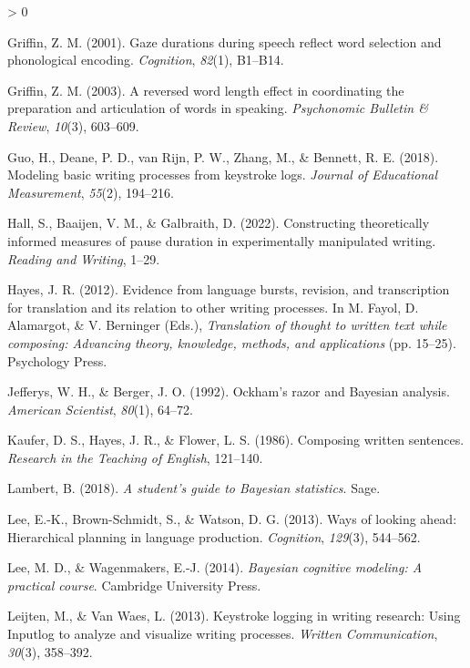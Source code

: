 \documentclass[
  english,
  man,floatsintext]{apa7}
\newlength{\cslhangindent}
\newenvironment{CSLReferences}[2] %
 {%
  \setlength{\parindent}{0pt}
  \ifodd #1 \everypar{\setlength{\hangindent}{\cslhangindent}}\ignorespaces\fi
  \ifnum #2 > 0
  \setlength{\parskip}{#2\baselineskip}
  \fi
 }%
 {}
\begin{document}
\begin{CSLReferences}{1}{0}
\leavevmode\hypertarget{ref-gri01}{}%
Griffin, Z. M. (2001). Gaze durations during speech reflect word selection and phonological encoding. \emph{Cognition}, \emph{82}(1), B1--B14.

\leavevmode\hypertarget{ref-griffin2003reversed}{}%
Griffin, Z. M. (2003). A reversed word length effect in coordinating the preparation and articulation of words in speaking. \emph{Psychonomic Bulletin \& Review}, \emph{10}(3), 603--609.

\leavevmode\hypertarget{ref-guo2018modeling}{}%
Guo, H., Deane, P. D., van Rijn, P. W., Zhang, M., \& Bennett, R. E. (2018). Modeling basic writing processes from keystroke logs. \emph{Journal of Educational Measurement}, \emph{55}(2), 194--216.

\leavevmode\hypertarget{ref-hall2022constructing}{}%
Hall, S., Baaijen, V. M., \& Galbraith, D. (2022). Constructing theoretically informed measures of pause duration in experimentally manipulated writing. \emph{Reading and Writing}, 1--29.

\leavevmode\hypertarget{ref-hayes2012evidence}{}%
Hayes, J. R. (2012). Evidence from language bursts, revision, and transcription for translation and its relation to other writing processes. In M. Fayol, D. Alamargot, \& V. Berninger (Eds.), \emph{Translation of thought to written text while composing: Advancing theory, knowledge, methods, and applications} (pp. 15--25). Psychology Press.

\leavevmode\hypertarget{ref-jefferys1992ockham}{}%
Jefferys, W. H., \& Berger, J. O. (1992). Ockham's razor and {B}ayesian analysis. \emph{American Scientist}, \emph{80}(1), 64--72.

\leavevmode\hypertarget{ref-kaufer1986composing}{}%
Kaufer, D. S., Hayes, J. R., \& Flower, L. S. (1986). Composing written sentences. \emph{Research in the Teaching of English}, 121--140.

\leavevmode\hypertarget{ref-lambert2018student}{}%
Lambert, B. (2018). \emph{A student's guide to {B}ayesian statistics}. Sage.

\leavevmode\hypertarget{ref-lee13}{}%
Lee, E.-K., Brown-Schmidt, S., \& Watson, D. G. (2013). Ways of looking ahead: Hierarchical planning in language production. \emph{Cognition}, \emph{129}(3), 544--562.

\leavevmode\hypertarget{ref-lee2014bayesian}{}%
Lee, M. D., \& Wagenmakers, E.-J. (2014). \emph{Bayesian cognitive modeling: A practical course}. Cambridge University Press.

\leavevmode\hypertarget{ref-leijten2013keystroke}{}%
Leijten, M., \& Van Waes, L. (2013). Keystroke logging in writing research: Using {Inputlog} to analyze and visualize writing processes. \emph{Written Communication}, \emph{30}(3), 358--392.


\end{CSLReferences}
\end{document}
